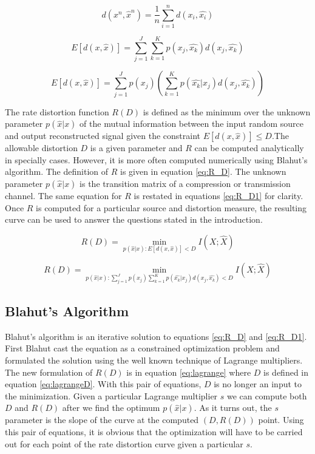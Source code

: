 \documentclass[journal]{IEEEtran}
\begin{document}
\begin{equation}
\label{eq:specDist}
d(x^n, \hat{x}^n) = \frac{1}{n}\sum_{i=1}^{n}{d(x_i, \hat{x_i})}
\end{equation}

\begin{equation}
\label{eq:expectedDist}
E[d(x, \hat{x})] = \sum_{j=1}^{J}{\sum_{k=1}^{K}p(x_j, \hat{x_k})d(x_j, \hat{x_k})}
\end{equation}

\begin{equation}
\label{eq:expectedDist2}
E[d(x, \hat{x})] = \sum_{j=1}^{J}p(x_j)\left({\sum_{k=1}^{K}p(\hat{x_k}|x_j)d(x_j, \hat{x_k})}\right)
\end{equation}

\par The rate distortion function \(R(D)\) is defined as the minimum over the unknown parameter \(p(\hat{x}|x)\) of the mutual information between the input random source and output reconstructed signal given the constraint \(E[d(x,\hat{x})] \leq D\).The allowable distortion \(D\) is a given parameter and \(R\) can be computed analytically in specially cases. However, it is more often computed numerically using Blahut's algorithm. The definition of \(R\) is given in equation \ref{eq:R_D}. The unknown parameter \(p(\hat{x}|x)\) is the transition matrix of a compression or transmission channel. The same equation for \(R\) is restated in equations \ref{eq:R_D1} for clarity. Once \(R\) is computed for a particular source and distortion measure, the resulting curve can be used to answer the questions stated in the introduction.

\begin{equation}
\label{eq:R_D}
R(D) = \min_{p(\hat{x}|x):E[d(x, \hat{x})] < D} I(X;\hat{X})
\end{equation}

\begin{equation}
\label{eq:R_D1}
R(D) = \min_{p(\hat{x}|x):\sum_{j=1}^{J}p(x_j)\sum_{k=1}^{K}{p(\hat{x_k}|x_j)d(x_j,\hat{x_k})} < D} I(X;\hat{X})
\end{equation}

\subsection{Blahut's Algorithm}
\par Blahut's algorithm is an iterative solution to equations \ref{eq:R_D} and \ref{eq:R_D1}. First Blahut cast the equation as a constrained optimization problem and formulated the solution using the well known technique of Lagrange multipliers. The new formulation of \(R(D)\) is in equation \ref{eq:lagrange} where \(D\) is defined in equation \ref{eq:lagrangeD}. With this pair of equations, \(D\) is no longer an input to the minimization. Given a particular Lagrange multiplier \(s\) we can compute both \(D\) and \(R(D)\) after we find the optimum \(p(\hat{x}|x)\). As it turns out, the \(s\) parameter is the slope of the curve at the computed \((D,R(D))\) point. Using this pair of equations, it is obvious that the optimization will have to be carried out for each point of the rate distortion curve given a particular \(s\).
\end{document}
